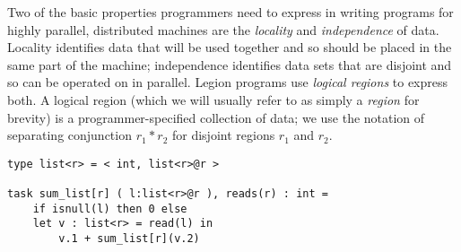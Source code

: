Two of the basic properties programmers need to express in writing
programs for highly parallel, distributed machines are the {\em
locality} and {\em independence} of data. Locality identifies data
that will be used together and so should be placed in the same part of
the machine; independence identifies data sets that are disjoint and
so can be operated on in parallel.  Legion programs use {\em logical
regions} to express both.  A logical region (which we will usually
refer to as simply a {\em region} for brevity) is a
programmer-specified collection of data; we use the notation of
separating conjunction $r_1 \ast r_2$ for disjoint regions $r_1$ and
$r_2$.







\begin{lstlisting}[label={lst:linkedlist},caption={Linked List Example}]
type list<r> = < int, list<r>@r >

task sum_list[r] ( l:list<r>@r ), reads(r) : int =
    if isnull(l) then 0 else
    let v : list<r> = read(l) in
        v.1 + sum_list[r](v.2)
\end{lstlisting}

